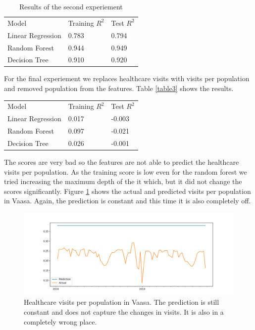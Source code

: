 \documentclass[a4paper, 12pt, english]{article}
\begin{document}
\begin{table}[h]
\begin{center}
\begin{tabular}{l l l}
Model & Training \(R^2\) & Test \(R^2\) \\
Linear Regression & 0.783 & 0.794 \\
Random Forest & 0.944 & 0.949 \\
Decision Tree & 0.910 & 0.920 \\
\end{tabular}
\end{center}
\caption{Results of the second experiement}
\label{table2}
\end{table}

For the final experiement we replaces healthcare
visits with visits per population and
removed population from the features.
Table \ref{table3} shows the results.

\begin{center}
\begin{tabular}{l l l}
Model & Training \(R^2\) & Test \(R^2\) \\
Linear Regression & 0.017 & -0.003 \\
Random Forest & 0.097 & -0.021 \\
Decision Tree & 0.026 & -0.001 \\
\end{tabular}
\end{center}
\label{table3}
\vspace{1.5em}

The scores are very bad so the features are not able
to predict the healthcare visits per population.
As the training score is low even for
the random forest we tried increasing the maximum depth of
the it which, but it did not change the scores significantly.
Figure \ref{predictions2} shows the actual and predicted
visits per population in Vaasa. Again, the prediction is
constant and this time it is also completely off.

\begin{figure}[h]
\includegraphics[width=\textwidth]{predictions2}
\caption{
Healthcare visits per population in Vaasa.
The prediction is still constant and does not
capture the changes in
visits. It is also in a completely wrong place.
}
\label{predictions2}
\end{figure}
\end{document}
